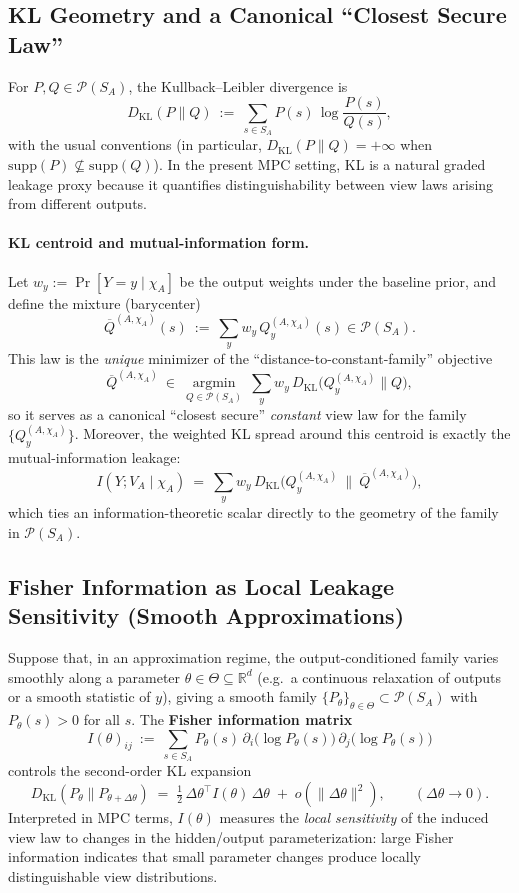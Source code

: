 \documentclass[11pt,a4paper]{article}
\theoremstyle{definition}
\theoremstyle{plain}
\newcommand{\R}{\mathbb{R}}
\newcommand{\Prob}{\mathcal{P}}
\begin{document}
\subsection{KL Geometry and a Canonical ``Closest Secure Law''}
\label{subsec:kl-geometry}
For $P,Q\in\Prob(S_A)$, the Kullback--Leibler divergence is
\[
D_{\mathrm{KL}}(P\|Q)\ :=\ \sum_{s\in S_A} P(s)\,\log\frac{P(s)}{Q(s)},
\]
with the usual conventions (in particular, $D_{\mathrm{KL}}(P\|Q)=+\infty$ when $\mathrm{supp}(P)\nsubseteq \mathrm{supp}(Q)$).
In the present MPC setting, KL is a natural graded leakage proxy because it quantifies distinguishability between view laws arising from different outputs.

\paragraph{KL centroid and mutual-information form.}
Let $w_y:=\Pr[Y=y\mid \chi_A]$ be the output weights under the baseline prior, and define the mixture (barycenter)
\[
\overline Q^{(A,\chi_A)}(s)\ :=\ \sum_{y} w_y\,Q_y^{(A,\chi_A)}(s)\in\Prob(S_A).
\]
This law is the \emph{unique} minimizer of the ``distance-to-constant-family'' objective
\[
\overline Q^{(A,\chi_A)}\ \in\ \operatorname*{argmin}_{Q\in\Prob(S_A)}\ \sum_{y} w_y\,D_{\mathrm{KL}}\!\bigl(Q_y^{(A,\chi_A)}\|Q\bigr),
\]
so it serves as a canonical ``closest secure'' \emph{constant} view law for the family $\{Q_y^{(A,\chi_A)}\}$.
Moreover, the weighted KL spread around this centroid is exactly the mutual-information leakage:
\[
I(Y;V_A\mid \chi_A)\ =\ \sum_y w_y\,D_{\mathrm{KL}}\!\bigl(Q_y^{(A,\chi_A)}\ \big\|\ \overline Q^{(A,\chi_A)}\bigr),
\]
which ties an information-theoretic scalar directly to the geometry of the family in $\Prob(S_A)$.

\subsection{Fisher Information as Local Leakage Sensitivity (Smooth Approximations)}
\label{subsec:fisher-local-geometry}
Suppose that, in an approximation regime, the output-conditioned family varies smoothly along a parameter $\theta\in\Theta\subseteq\R^d$ (e.g.\ a continuous relaxation of outputs or a smooth statistic of $y$), giving a smooth family $\{P_\theta\}_{\theta\in\Theta}\subset \Prob(S_A)$ with $P_\theta(s)>0$ for all $s$.
The \textbf{Fisher information matrix}
\[
I(\theta)_{ij}\ :=\ \sum_{s\in S_A} P_\theta(s)\,
\partial_i\!\bigl(\log P_\theta(s)\bigr)\,
\partial_j\!\bigl(\log P_\theta(s)\bigr)
\]
controls the second-order KL expansion
\[
D_{\mathrm{KL}}(P_\theta\|P_{\theta+\Delta\theta})
\;=\;
\tfrac12\,\Delta\theta^\top I(\theta)\,\Delta\theta
\;+\;o(\|\Delta\theta\|^2),
\qquad (\Delta\theta\to 0).
\]
Interpreted in MPC terms, $I(\theta)$ measures the \emph{local sensitivity} of the induced view law to changes in the hidden/output parameterization: large Fisher information indicates that small parameter changes produce locally distinguishable view distributions.
\end{document}
